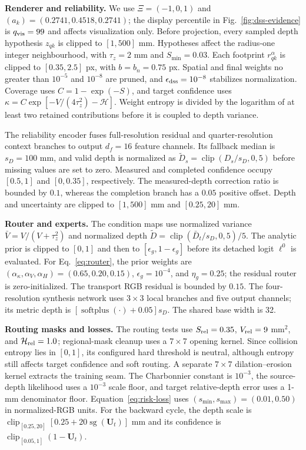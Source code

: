 \documentclass[letterpaper,10pt,conference]{ieeeconf}
\newcommand{\U}{\mathbf{U}}
\begin{document}
\noindent\textbf{Renderer and reliability.}
We use $\Xi=(-1,0,1)$ and $(a_k)=(0.2741,0.4518,0.2741)$; the display
percentile in Fig.~\ref{fig:dss-evidence} is $q_{\rm vis}=99$ and affects
visualization only. Before projection, every sampled depth
hypothesis $z_{qk}$ is clipped to $[1,500]$ mm. Hypotheses affect the radius-one
integer neighbourhood, with $\tau_z=2$ mm and $S_{\min}=0.03$. Each footprint
$r^\alpha_{qk}$ is clipped to $[0.35,2.5]$ px, with $b=b_n=0.75$ px. Spatial
and final weights no greater than $10^{-5}$ and $10^{-8}$ are pruned, and
$\epsilon_{\rm dss}=10^{-8}$ stabilizes normalization.
Coverage uses $C=1-\exp(-S)$, and target confidence uses
$\kappa=C\exp[-V/(4\tau_z^2)-\mathcal H]$. Weight entropy is divided by the
logarithm of at least two retained contributions before it is coupled to depth
variance.

The reliability encoder fuses full-resolution residual and quarter-resolution
context branches to output $d_f=16$ feature channels. Its fallback median is
$s_D=100$ mm, and valid depth is normalized as
$\widetilde D_s=\operatorname{clip}(D_s/s_D,0,5)$ before missing values are set
to zero. Measured and completed confidence occupy $[0.5,1]$ and $[0,0.35]$,
respectively. The measured-depth correction ratio is bounded by $0.1$, whereas
the completion branch has a $0.05$ positive offset. Depth and uncertainty are
clipped to $[1,500]$ mm and $[0.25,20]$ mm.

\noindent\textbf{Router and experts.}
The condition maps use normalized variance
$\bar V=V/(V+\tau_z^2)$ and normalized depth
$\widetilde D=\operatorname{clip}(\bar D_t/s_D,0,5)/5$. The analytic prior is
clipped to $[0,1]$ and then to $[\epsilon_g,1-\epsilon_g]$ before its detached
logit $\ell^0$ is evaluated. For Eq.~\eqref{eq:router}, the prior weights are
$(\alpha_\kappa,\alpha_V,\alpha_H)=(0.65,0.20,0.15)$,
$\epsilon_g=10^{-4}$, and $\eta_g=0.25$; the residual router is
zero-initialized. The transport RGB residual is bounded by $0.15$. The
four-resolution synthesis network uses $3\times3$ local branches and five
output channels; its metric depth is
$[\operatorname{softplus}(\cdot)+0.05]s_D$. The shared base width is 32.

\noindent\textbf{Routing masks and losses.}
The routing tests use $S_{\rm rel}=0.35$, $V_{\rm rel}=9$ mm$^2$, and
$\mathcal H_{\rm rel}=1.0$; regional-mask cleanup uses a $7\times7$ opening kernel. Since
collision entropy lies in $[0,1]$, its configured hard threshold is neutral,
although entropy still affects target confidence and soft routing. A separate
$7\times7$ dilation--erosion kernel extracts the training seam. The
Charbonnier constant is $10^{-3}$, the source-depth likelihood uses a
$10^{-3}$ scale floor, and target relative-depth error uses a 1-mm denominator
floor. Equation~\eqref{eq:risk-loss} uses
$(s_{\min},s_{\max})=(0.01,0.50)$ in normalized-RGB units. For the backward
cycle, the depth scale is
$\operatorname{clip}_{[0.25,20]}[0.25+20\operatorname{sg}(\U_t)]$ mm and its
confidence is $\operatorname{clip}_{[0.05,1]}(1-\U_t)$.
\end{document}
